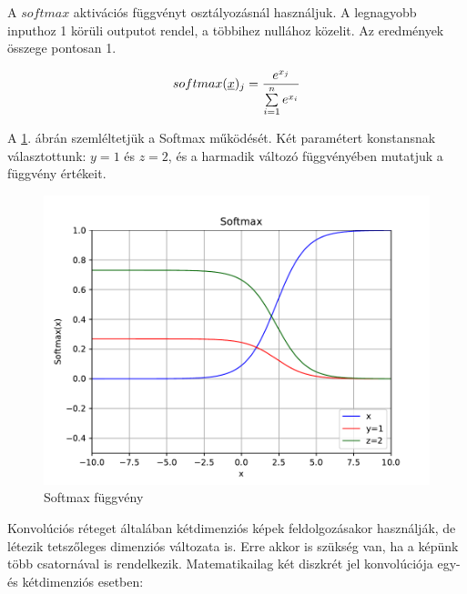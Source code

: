 A $ softmax $ aktivációs függvényt osztályozásnál használjuk. A legnagyobb inputhoz 1 körüli outputot rendel, a többihez nullához közelit. Az eredmények összege pontosan 1.
 
\[  softmax(\underline{x})_j = \dfrac{e^{x_j}}{\sum\limits_{{i}=1}^{n}e^{x_i}}  \]

A \ref{fig:softmax}. ábrán szemléltetjük a Softmax működését. Két paramétert konstansnak választottunk: $ y=1 $ és $ z=2 $, és a harmadik változó függvényében mutatjuk a függvény értékeit.

\begin{figure} [h!]
	
	\centering
	\includegraphics[scale=0.5]{img/Softmax.pdf}
	\caption{Softmax függvény}
	\label{fig:softmax}
		
\end{figure}








Konvolúciós réteget általában kétdimenziós képek feldolgozásakor használják, de létezik tetszőleges dimenziós változata is. Erre akkor is szükség van, ha a képünk több csatornával is rendelkezik. Matematikailag két diszkrét jel konvolúciója egy- és kétdimenziós esetben:


